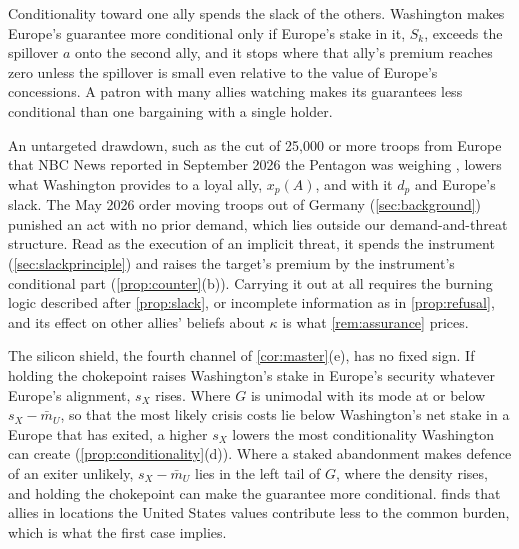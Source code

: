 Conditionality toward one ally spends the slack of the others. Washington makes Europe's guarantee more conditional only if Europe's stake in it, $S_k$, exceeds the spillover $a$ onto the second ally, and it stops where that ally's premium reaches zero unless the spillover is small even relative to the value of Europe's concessions. A patron with many allies watching makes its guarantees less conditional than one bargaining with a single holder.

An untargeted drawdown, such as the cut of 25,000 or more troops from Europe that NBC News reported in September 2026 the Pentagon was weighing \citep{nbc2026pentagon}, lowers what Washington provides to a loyal ally, $x_p(A)$, and with it $d_p$ and Europe's slack. The May 2026 order moving troops out of Germany (\cref{sec:background}) punished an act with no prior demand, which lies outside our demand-and-threat structure. Read as the execution of an implicit threat, it spends the instrument (\cref{sec:slackprinciple}) and raises the target's premium by the instrument's conditional part (\cref{prop:counter}(b)). Carrying it out at all requires the burning logic described after \cref{prop:slack}, or incomplete information as in \cref{prop:refusal}, and its effect on other allies' beliefs about $\kappa$ is what \cref{rem:assurance} prices.

The silicon shield, the fourth channel of \cref{cor:master}(e), has no fixed sign. If holding the chokepoint raises Washington's stake in Europe's security whatever Europe's alignment, $s_X$ rises. Where $G$ is unimodal with its mode at or below $s_X-\bar m_U$, so that the most likely crisis costs lie below Washington's net stake in a Europe that has exited, a higher $s_X$ lowers the most conditionality Washington can create (\cref{prop:conditionality}(d)). Where a staked abandonment makes defence of an exiter unlikely, $s_X-\bar m_U$ lies in the left tail of $G$, where the density rises, and holding the chokepoint can make the guarantee more conditional. \citet{blankenship2021price} finds that allies in locations the United States values contribute less to the common burden, which is what the first case implies.

